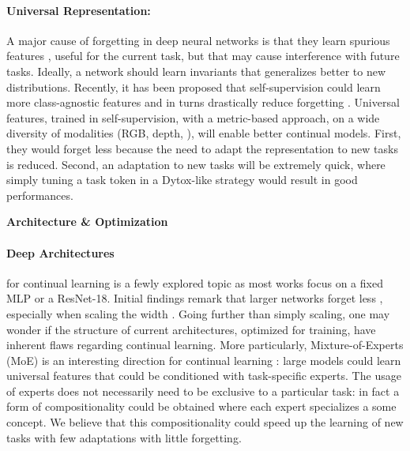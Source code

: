 \paragraph{Universal Representation:} A major cause of forgetting in deep neural networks is that
they learn spurious features \citep{lesort2022spuriousfeatures}, useful for the current task, but
that may cause interference with future tasks. Ideally, a network should learn invariants
\citep{arjovsky2019irm,rame2021fishr} that generalizes better to new distributions. Recently, it has
been proposed that self-supervision could learn more class-agnostic features and in turns
drastically reduce forgetting \citep{gallardo2021selfsupcontinual}. Universal
features, trained in self-supervision, with a metric-based approach, on a wide diversity of
modalities (RGB, depth, \etc), will enable better continual models. First, they would forget less
because the need to adapt the representation to new tasks is reduced. Second, an adaptation to new
tasks will be extremely quick, where simply tuning a task token in a Dytox-like strategy would
result in good performances.

\vspace{2em}
\noindent\large{\textbf{Architecture \& Optimization}}

\paragraph{Deep Architectures} for continual learning is a fewly explored topic as most works focus
on a fixed MLP or a ResNet-18. Initial findings remark that larger networks forget less
\citep{ramasesh2022scalecontinual}, especially when scaling the width
\citep{mirzadeh2022widecontinualnetworks}. Going further than simply scaling, one may wonder if the
structure of current architectures, optimized for \iid training, have inherent flaws regarding
continual learning. More particularly, Mixture-of-Experts (MoE) is an interesting direction for
continual learning \citep{caccia2022anytimelearning}: large models could learn universal features
that could be conditioned with task-specific experts. The usage of experts does not necessarily need
to be exclusive to a particular task: in fact a form of compositionality could be obtained where
each expert specializes a some concept. We believe that this compositionality could speed up the
learning of new tasks with few adaptations with little forgetting.

